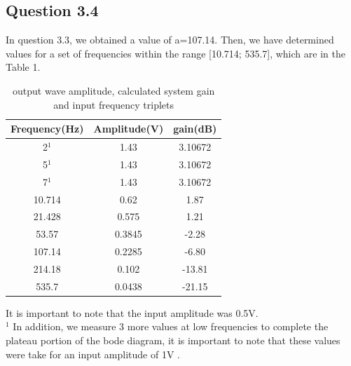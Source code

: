 \documentclass[a4paper,8pt]{extarticle}
\begin{document}
        \subsection*{Question 3.4}
        In question 3.3, we obtained a value of a=107.14. Then, we have determined values for a set of frequencies within the range [10.714; 535.7], which are in the Table 1.
       \begin{table}[H]
       \centering
        \begin{tabular}{|c||c|c|}
            \hline
            Frequency(Hz) & Amplitude(V) & gain(dB)\\ \hline\hline
            2$^1$         & 1.43         & 3.10672  \\ \hline
            5$^1$         & 1.43         & 3.10672   \\ \hline
            7$^1$         & 1.43         & 3.10672    \\ \hline
            10.714        & 0.62         & 1.87        \\ \hline
            21.428        & 0.575        & 1.21         \\ \hline
            53.57         & 0.3845       & -2.28         \\ \hline
            107.14        & 0.2285       & -6.80          \\ \hline
            214.18        & 0.102        & -13.81          \\ \hline
            535.7         & 0.0438       & -21.15           \\ \hline
        \end{tabular}
        \caption{output wave amplitude, calculated system gain and input frequency triplets}
    \end{table}
     It is important to note that the input amplitude was 0.5V.\\ 
     $^1$ In addition, we measure 3 more values at low frequencies to complete the plateau portion of the bode diagram, it is important to note that these values were take for an input amplitude of 1V . 
    
\end{document}
